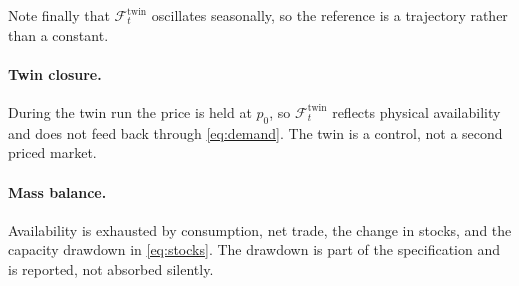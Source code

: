 Note finally that \(\mathcal{F}^{\mathrm{twin}}_t\) oscillates seasonally,
so the reference is a trajectory rather than a constant.

\paragraph{Twin closure.}
During the twin run the price is held at \(p_0\), so
\(\mathcal{F}^{\mathrm{twin}}_t\) reflects physical availability and does
not feed back through \eqref{eq:demand}. The twin is a control, not a
second priced market.

\paragraph{Mass balance.}
Availability is exhausted by consumption, net trade, the change in stocks,
and the capacity drawdown in \eqref{eq:stocks}. The drawdown is part of the
specification and is reported, not absorbed silently.

